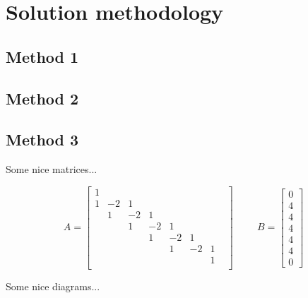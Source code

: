 
\chapter{Solution methodology} \label{chap:methodology}

\bt

\section{Method 1}

\bt

\section{Method 2}

\bt 

\section{Method 3}

Some nice matrices...

\begin{equation}
	A = \begin{bmatrix}
		1 &    &    &    &    &    &    & \\
		1 & -2 &  1 &    &    &    &    & \\
		  &  1 & -2 &  1 &    &    &    & \\
		  &    &  1 & -2 &  1 &    &    & \\
		  &    &    &  1 & -2 &  1 &    & \\
		  &    &    &    &  1 & -2 &  1 & \\
		  &    &    &    &    &    &  1 & \\
	\end{bmatrix}
	\hspace{1cm}
	B = \begin{bmatrix}
		0 \\
		4 \\
		4 \\
		4 \\
		4 \\
		4 \\
		0
	\end{bmatrix}
\end{equation}

Some nice diagrams...

\newcommand{\cv}[1]{ %
	$\begin{bmatrix} #1 \end{bmatrix}$
}
\newcommand{\Cv}[1]{ { \cv{#1} } } %
\newcommand{\elim} { $\xrightarrow{E}$ }
\newcommand{\merge} { $\xrightarrow{M}$ }
\newcommand{\xtract} { $\xrightarrow{X}$ }

